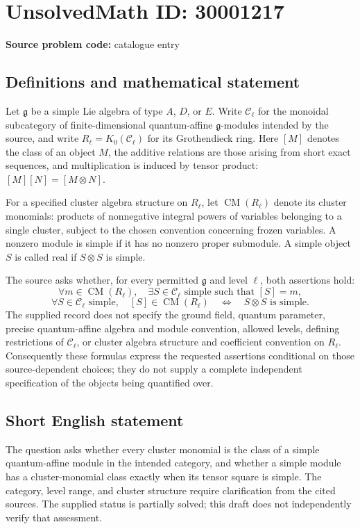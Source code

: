 \documentclass[11pt]{article}
\begin{document}
\section*{UnsolvedMath ID: 30001217}
\textbf{Source problem code:} catalogue entry
\subsection{Definitions and mathematical statement}
Let \(\mathfrak g\) be a simple Lie algebra of type \(A\), \(D\), or \(E\). Write \(\mathcal C_\ell\) for the monoidal subcategory of finite-dimensional quantum-affine \(\mathfrak g\)-modules intended by the source, and write \(R_\ell=K_0(\mathcal C_\ell)\) for its Grothendieck ring. Here \([M]\) denotes the class of an object \(M\), the additive relations are those arising from short exact sequences, and multiplication is induced by tensor product: \([M][N]=[M\otimes N]\).

For a specified cluster algebra structure on \(R_\ell\), let \(\operatorname{CM}(R_\ell)\) denote its cluster monomials: products of nonnegative integral powers of variables belonging to a single cluster, subject to the chosen convention concerning frozen variables. A nonzero module is simple if it has no nonzero proper submodule. A simple object \(S\) is called real if \(S\otimes S\) is simple.

The source asks whether, for every permitted \(\mathfrak g\) and level \(\ell\), both assertions hold:
\[
\forall m\in\operatorname{CM}(R_\ell),\quad
\exists S\in\mathcal C_\ell\text{ simple such that }[S]=m,
\]
\[
\forall S\in\mathcal C_\ell\text{ simple},\quad
[S]\in\operatorname{CM}(R_\ell)
\quad\Longleftrightarrow\quad
S\otimes S\text{ is simple}.
\]
The supplied record does not specify the ground field, quantum parameter, precise quantum-affine algebra and module convention, allowed levels, defining restrictions of \(\mathcal C_\ell\), or cluster algebra structure and coefficient convention on \(R_\ell\). Consequently these formulas express the requested assertions conditional on those source-dependent choices; they do not supply a complete independent specification of the objects being quantified over.
\subsection{Short English statement}
The question asks whether every cluster monomial is the class of a simple quantum-affine module in the intended category, and whether a simple module has a cluster-monomial class exactly when its tensor square is simple. The category, level range, and cluster structure require clarification from the cited sources. The supplied status is partially solved; this draft does not independently verify that assessment.
\end{document}
